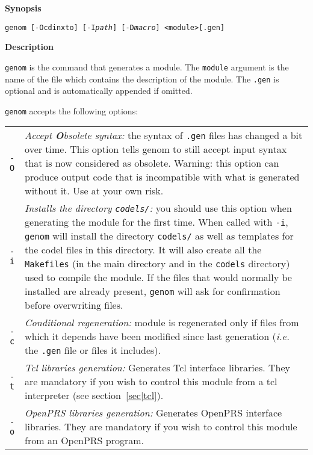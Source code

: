 \begin{description}

\item\textbf{Synopsis}

\texttt{genom [-Ocdinxto] [-I\emph{path}] [-D\emph{macro}] <module>[.gen]}

\item\textbf{Description}

\texttt{genom}  is the  command that  generates a  module. The  \texttt{module}
argument is the name  of the file which  contains the description of  the
module. The \texttt{.gen} is   optional and  is  automatically appended  if
omitted.

\texttt{genom} accepts the following options:

\begin{tabularx}{\linewidth}{lX}
\texttt{-O} & \emph{Accept \textbf{O}bsolete syntax:} the syntax of
\texttt{.gen} files has changed a bit over time. This option tells
genom to still accept input syntax that is now considered as obsolete.
Warning: this option can produce output code that is incompatible with
what is generated without it. Use at your own risk. \\

\texttt{-i} &  \emph{Installs the  directory  \texttt{codels/}:} you should  use
this option when  generating the module  for the first time. When  called
with \texttt{-i}, \texttt{genom} will install  the directory \texttt{codels/} as
well as templates for  the codel files in this  directory.  It  will also
create  all the \texttt{Makefiles}  (in the main directory   and in the 
\texttt{codels} directory) used to compile  the module.  If  the files that would
normally be  installed  are already present, \texttt{genom}  will ask  for
confirmation before overwriting files.\\

\texttt{-c} & \emph{Conditional regeneration:} module is regenerated only
if files from which  it depends have  been modified since last generation
(\emph{i.e.} the \texttt{.gen} file or files it includes).\\

\texttt{-t} &    \emph{Tcl libraries  generation:}    Generates Tcl interface
libraries. They are mandatory  if you wish to  control this module from a
tcl interpreter (see section~\ref{sec|tcl}).\\

\texttt{-o}  & \emph{OpenPRS libraries generation:} Generates OpenPRS
interface libraries.  They are  mandatory  if you   wish to  control this
module from an OpenPRS program.\\


\end{tabularx}
\end{description}
